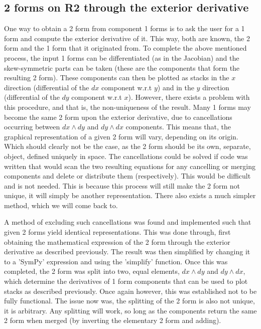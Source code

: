 \documentclass[11]{report}
\begin{document}
\subsection{2 forms on R2 through the exterior derivative}
One way to obtain a 2 form from component 1 forms is to ask the user for a 1 form and compute the exterior derivative of it. This way, both are known, the 2 form and the 1 form that it originated from. To complete the above mentioned process, the input 1 forms can be differentiated (as in the Jacobian) and the skew-symmetric parts can be taken (these are the components that form the resulting 2 form). These components can then be plotted as stacks in the $x$ direction (differential of the $dx$ component w.r.t $y$) and in the $y$ direction (differential of the $dy$ component w.r.t $x$). However, there exists a problem with this procedure, and that is, the non-uniqueness of the result. Many 1 forms may become the same 2 form upon the exterior derivative, due to cancellations occurring between $dx \wedge dy$ and $dy\wedge dx$ components. This means that, the graphical representation of a given 2 form will vary, depending on its origin. Which should clearly not be the case, as the 2 form should be its own, separate, object, defined uniquely in space.
The cancellations could be solved if code was written that would scan the two resulting equations for any cancelling or merging components and delete or distribute them (respectively). This would be difficult and is not needed. This is because this process will still make the 2 form not unique, it will simply be another representation. There also exists a much simpler method, which we will come back to.

A method of excluding such cancellations was found and implemented such that given 2 forms yield identical representations. This was done through, first obtaining the mathematical expression of the 2 form through the exterior derivative as described previously. The result was then simplified by changing it to a 'SymPy' expression and using the 'simplify' function. Once this was completed, the 2 form was split into two, equal elements, $dx \wedge dy$ and $dy\wedge dx$, which determine the derivatives of 1 form components that can be used to plot stacks as described previously.
Once again however, this was established not to be fully functional. The issue now was, the splitting of the 2 form is also not unique, it is arbitrary. Any splitting will work, so long as the components return the same 2 form when merged (by inverting the elementary 2 form and adding).
\end{document}

